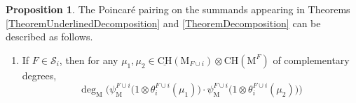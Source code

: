 \documentclass[11pt,reqno]{amsart}
\theoremstyle{definition}
\newtheorem{proposition}[theorem]{Proposition}
\theoremstyle{remark}
\renewcommand{\(}{\left(}
\renewcommand{\)}{\right)}
\newcommand{\<}{\left<}
\renewcommand{\>}{\right>}
\newcommand{\CH}{\operatorname{CH}}
\begin{document}


\begin{proposition}\label{lemma_bothdegree}
The Poincar\'e pairing on the summands  appearing in Theorems  \ref{TheoremUnderlinedDecomposition} and \ref{TheoremDecomposition} can be described as follows.
\begin{enumerate}[(1)]\itemsep 5pt
\item If $F\in \mathscr{S}_i$, 
then for any $\mu_1, \mu_2\in \underline{\mathrm{CH}}(\mathrm{M}_{F\cup i}) \otimes {\mathrm{CH}}(\mathrm{M}^{F})$ of complementary degrees,
\[
\deg_{\mathrm{M}}\big(\psi^{F\cup i}_{\mathrm{M}}\big(1 \otimes \theta_i^{F \cup i}(\mu_1)\big)\cdot \psi^{F\cup i}_{\mathrm{M}}\big(1 \otimes \theta_i^{F \cup i}(\mu_2)\big) \big)
\]
\end{enumerate}
\end{proposition}
\end{document}
